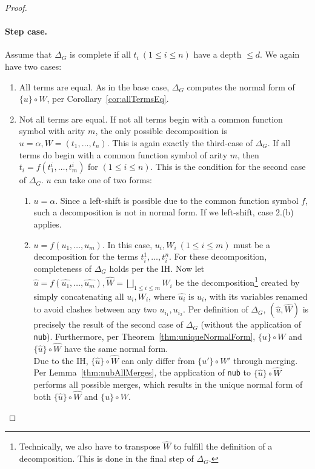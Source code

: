 \documentclass[a4paper, 11pt]{report}
\begin{document}
\begin{proof}
  \paragraph{Step case.} Assume that $\Delta_G$ is complete if all $t_i\ (1 \leq i \leq n)$ have a depth $\leq d$.
  We again have two cases:
  \begin{enumerate}
    \item All terms are equal. As in the base case, $\Delta_G$ computes the normal form of $\{u\} \circ W$, per Corollary~\ref{cor:allTermsEq}.
    \item Not all terms are equal. If not all terms begin with a common function symbol with arity $m$, the only possible decomposition is $u=\alpha, W=(t_1,\dots,t_n)$. This is again exactly the third-case of $\Delta_G$.
    If all terms do begin with a common function symbol of arity $m$, then $t_i = f(t_1^i,\dots,t_m^i)$ for  $(1 \leq i \leq n)$. This is the condition for the second case of $\Delta_G$. $u$ can take one of two forms:
    \begin{enumerate}
      \item $u=\alpha$. Since a left-shift is possible due to the common function symbol $f$, such a decomposition is not in normal form. If we left-shift, case 2.(b) applies.
      \item $u=f(u_1,\dots,u_m)$. In this case, $u_i, W_i\ (1 \leq i \leq m)$ must be a decomposition for the terms $t_i^1,\dots,t_i^n$. For these decomposition, completeness of $\Delta_G$ holds per the IH. Now let $\widehat{u}=f(\widehat{u_1},\dots,\widehat{u_m}),\widehat{W}=\bigsqcup\limits_{1 \leq i \leq m} W_i$ be the decomposition\footnote{Technically, we also have to transpose $\widehat{W}$ to fulfill the definition of a decomposition. This is done in the final step of $\Delta_G$.} created by simply concatenating all $u_i,W_i$, where $\widehat{u_i}$ is $u_i$, with its variables renamed to avoid clashes between any two $u_{i_1}, u_{i_2}$. Per definition of $\Delta_G$, $(\widehat{u},\widehat{W})$ is precisely the result of the second case of $\Delta_G$ (without the application of \texttt{nub}). Furthermore, per Theorem~\ref{thm:uniqueNormalForm}, $\{u\} \circ W$ and $\{\widehat{u}\} \circ \widehat{W}$ have the same normal form.\\

      Due to the IH, $\{\widehat{u}\} \circ \widehat{W}$ can only differ from $\{u'\} \circ W'$ through merging. Per Lemma~\ref{thm:nubAllMerges}, the application of \texttt{nub} to $\{\widehat{u}\} \circ \widehat{W}$ performs all possible merges, which results in the unique normal form of both $\{\widehat{u}\} \circ \widehat{W}$ and $\{u\} \circ W$.
    \end{enumerate}
  \end{enumerate}
\end{proof}
\end{document}

